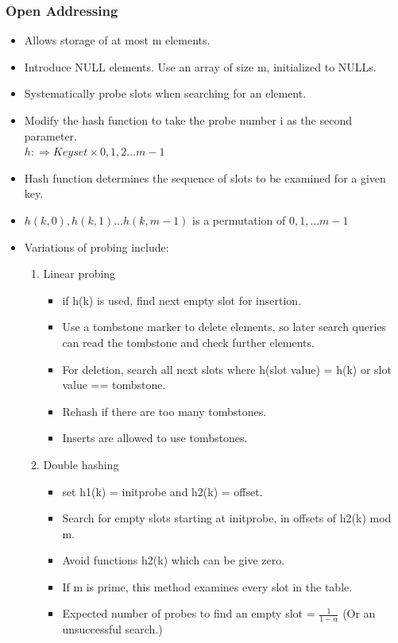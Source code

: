 \documentclass{report}
\begin{document}
\subsubsection{Open Addressing}
\begin{itemize}
\item Allows storage of at most m elements.
\item Introduce NULL elements. Use an array of size m, initialized to NULLs.
\item Systematically probe slots when searching for an element.
\item Modify the hash function to take the probe number i as the second parameter.\\
$h:\Longrightarrow Keyset \times {0, 1, 2 ... m-1}$
\item Hash function determines the sequence of slots to be examined for a given key.
\item ${h(k,0), h(k,1)...h(k,m-1)}$ is a permutation of ${0,1, ... m-1}$
\item Variations of probing include:
\begin{enumerate}
    \item Linear probing
    \begin{itemize}
        \item if h(k) is used, find next empty slot for insertion.
        \item Use a tombstone marker to delete elements, so later search queries can read the tombstone and check further elements.
        \item For deletion, search all next slots where h(slot value) = h(k) or slot value == tombstone.
        \item Rehash if there are too many tombstones.
        \item Inserts are allowed to use tombstones.
    \end{itemize}
    \item Double hashing
    \begin{itemize}
        \item set h1(k) = initprobe and h2(k) = offset.
        \item Search for empty slots starting at initprobe, in offsets of h2(k) mod m.
        \item Avoid functions h2(k) which can be give zero.
        \item If m is prime, this method examines every slot in the table.
        \item Expected number of probes to find an empty slot = $\frac{1}{1-\alpha}$ (Or an unsuccessful search.)
    \end{itemize}
\end{enumerate}
\end{itemize}
\end{document}
